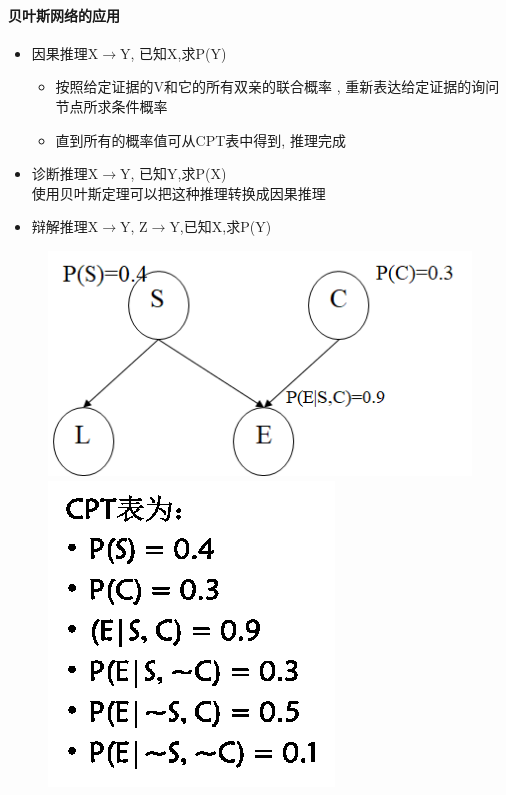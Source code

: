 \documentclass[UTF8,a4paper]{ctexart}
\begin{document}
\paragraph{贝叶斯网络的应用}
\begin{itemize}
	\item 因果推理X$\to$Y, 已知X,求P(Y)
	      \begin{itemize}
		      \item 按照给定证据的V和它的所有双亲的联合概率 , 重新表达给定证据的询问节点所求条件概率
		      \item 直到所有的概率值可从CPT表中得到, 推理完成
	      \end{itemize}
	\item 诊断推理X$\to$Y, 已知Y,求P(X)\\
	      使用贝叶斯定理可以把这种推理转换成因果推理
	\item 辩解推理X$\to$Y, Z$\to$Y,已知X,求P(Y)
\end{itemize}


\begin{figure}[H]
	\centering
	\includegraphics[scale = 0.3]{assets/ArtificialIntelligence/2018-01-08-23-05-56.png}
	\includegraphics[scale = 0.3]{assets/ArtificialIntelligence/2018-01-08-23-07-31.png}
\end{figure}
\end{document}
